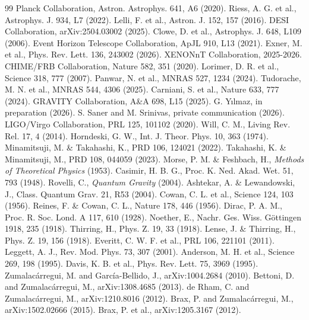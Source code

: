 \documentclass[12pt, a4paper]{article}
\begin{document}
\begin{thebibliography}{99}
 Planck Collaboration, Astron. Astrophys. 641, A6 (2020).
 Riess, A. G. et al., Astrophys. J. 934, L7 (2022).
 Lelli, F. et al., Astron. J. 152, 157 (2016).
 DESI Collaboration, arXiv:2504.03002 (2025).
 Clowe, D. et al., Astrophys. J. 648, L109 (2006).
 Event Horizon Telescope Collaboration, ApJL 910, L13 (2021).
 Exner, M. et al., Phys. Rev. Lett. 136, 243002 (2026).
 XENONnT Collaboration, 2025-2026.
 CHIME/FRB Collaboration, Nature 582, 351 (2020).
 Lorimer, D. R. et al., Science 318, 777 (2007).
 Panwar, N. et al., MNRAS 527, 1234 (2024).
 Tudorache, M. N. et al., MNRAS 544, 4306 (2025).
 Carniani, S. et al., Nature 633, 777 (2024).
 GRAVITY Collaboration, A\&A 698, L15 (2025).
 G. Yılmaz, in preparation (2026).
 S. Saner and M. Srinivas, private communication (2026).
 LIGO/Virgo Collaboration, PRL 125, 101102 (2020).
 Will, C. M., Living Rev. Rel. 17, 4 (2014).
 Horndeski, G. W., Int. J. Theor. Phys. 10, 363 (1974).
 Minamitsuji, M. \& Takahashi, K., PRD 106, 124021 (2022).
 Takahashi, K. \& Minamitsuji, M., PRD 108, 044059 (2023).
 Morse, P. M. \& Feshbach, H., \textit{Methods of Theoretical Physics} (1953).
 Casimir, H. B. G., Proc. K. Ned. Akad. Wet. 51, 793 (1948).
 Rovelli, C., \textit{Quantum Gravity} (2004).
 Ashtekar, A. \& Lewandowski, J., Class. Quantum Grav. 21, R53 (2004).
 Cowan, C. L. et al., Science 124, 103 (1956).
 Reines, F. \& Cowan, C. L., Nature 178, 446 (1956).
 Dirac, P. A. M., Proc. R. Soc. Lond. A 117, 610 (1928).
 Noether, E., Nachr. Ges. Wiss. Göttingen 1918, 235 (1918).
 Thirring, H., Phys. Z. 19, 33 (1918).
 Lense, J. \& Thirring, H., Phys. Z. 19, 156 (1918).
 Everitt, C. W. F. et al., PRL 106, 221101 (2011).
 Leggett, A. J., Rev. Mod. Phys. 73, 307 (2001).
 Anderson, M. H. et al., Science 269, 198 (1995).
 Davis, K. B. et al., Phys. Rev. Lett. 75, 3969 (1995).
 Zumalacárregui, M. and García-Bellido, J., arXiv:1004.2684 (2010).
 Bettoni, D. and Zumalacárregui, M., arXiv:1308.4685 (2013).
 de Rham, C. and Zumalacárregui, M., arXiv:1210.8016 (2012).
 Brax, P. and Zumalacárregui, M., arXiv:1502.02666 (2015).
 Brax, P. et al., arXiv:1205.3167 (2012).
\end{thebibliography}
\end{document}
